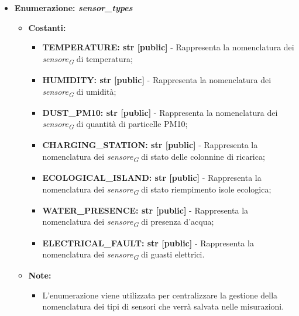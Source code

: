 \begin{itemize}
    \item\textbf{Enumerazione: \textit{sensor\_types}}
    \begin{itemize}
        \item \textbf{Costanti:} 
        \begin{itemize}
            \item \textbf{TEMPERATURE: str [public]} - Rappresenta la nomenclatura dei \textit{sensore}\textsubscript{\textit{G}} di temperatura;
            \item \textbf{HUMIDITY: str [public]} - Rappresenta la nomenclatura dei \textit{sensore}\textsubscript{\textit{G}} di umidità;
            \item \textbf{DUST\_PM10: str [public]} - Rappresenta la nomenclatura dei \textit{sensore}\textsubscript{\textit{G}} di quantità di particelle PM10;
            \item \textbf{CHARGING\_STATION: str [public]} - Rappresenta la nomenclatura dei \textit{sensore}\textsubscript{\textit{G}} di stato delle colonnine di ricarica;
            \item \textbf{ECOLOGICAL\_ISLAND: str [public]} - Rappresenta la nomenclatura dei \textit{sensore}\textsubscript{\textit{G}} di stato riempimento isole ecologica;
            \item \textbf{WATER\_PRESENCE: str [public]} - Rappresenta la nomenclatura dei \textit{sensore}\textsubscript{\textit{G}} di presenza d'acqua;
            \item \textbf{ELECTRICAL\_FAULT: str [public]} - Rappresenta la nomenclatura dei \textit{sensore}\textsubscript{\textit{G}} di guasti elettrici.
        \end{itemize}
        \item \textbf{Note:}
        \begin{itemize}
            \item L'enumerazione viene utilizzata per centralizzare la gestione della nomenclatura dei tipi di sensori che verrà salvata nelle misurazioni.
        \end{itemize}
    \end{itemize}


\end{itemize}
